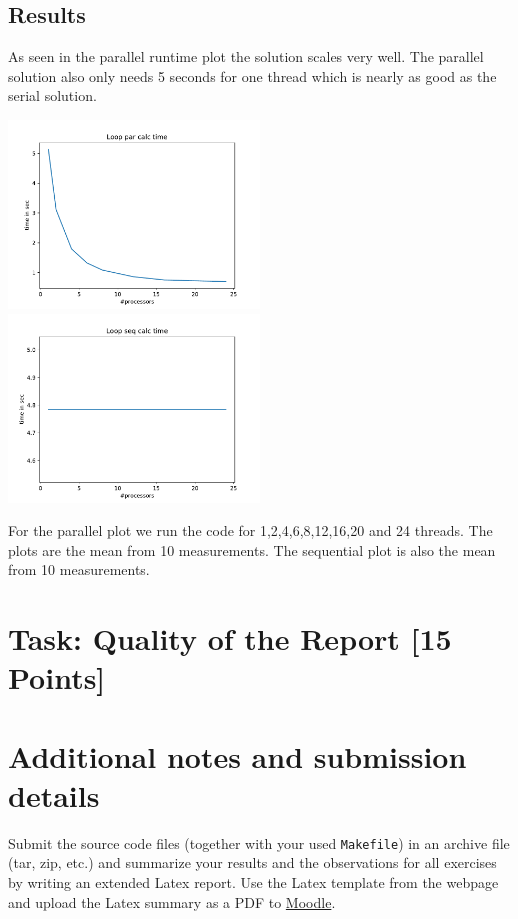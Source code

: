 \documentclass[unicode,11pt,a4paper,oneside,numbers=endperiod,openany]{scrartcl}
\begin{document}
\subsection{Results}

As seen in the parallel runtime plot the solution scales very well. The parallel solution also only needs 5 seconds for one thread which is nearly as good as the serial solution.


\includegraphics[width=0.5\textwidth]{../results/par_loop.pdf}
\includegraphics[width=0.5\textwidth]{../results/seq_loop.pdf}

For the parallel plot we run the code for 1,2,4,6,8,12,16,20 and 24 threads. The plots are the mean from 10 measurements.
The sequential plot is also the mean from 10 measurements.

\section{Task:  Quality of the Report   [15 Points]}


\section*{Additional notes and submission details}
Submit the source code files (together with your used \texttt{Makefile}) in
an archive file (tar, zip, etc.) and summarize your results and the
observations for all exercises by writing an extended Latex report.
Use the Latex template from the webpage and upload the Latex summary
as a PDF to \href{https://moodle-app2.let.ethz.ch/course/view.php?id=14316}{Moodle}.
\end{document}
